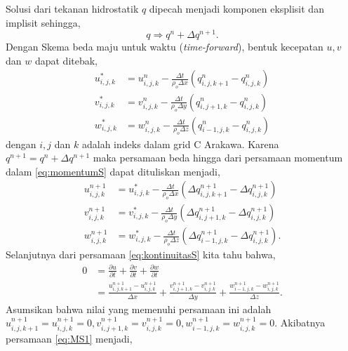 \begin{spacing}{1.5}
	Solusi dari tekanan hidrostatik $q$ dipecah menjadi komponen eksplisit dan implisit sehingga,
	\begin{equation*}
		q \Rightarrow q^n + \Delta q^{n+1}.
	\end{equation*}
	Dengan Skema beda maju untuk waktu (\textit{time-forward}), bentuk kecepatan $u, v$ dan $w$ dapat ditebak,
	\begin{equation}
		\begin{aligned}
			u_{i,j,k}^{*} &= u_{i,j,k}^{n}-\frac{\Delta t}{\rho_o \Delta x}(q_{i,j,k+1}^{n}-q_{i,j,k}^{n}) \\
			v_{i,j,k}^{*} &= v_{i,j,k}^{n}-\frac{\Delta t}{\rho_o \Delta y}(q_{i,j+1,k}^{n}-q_{i,j,k}^{n})
			\\
			w_{i,j,k}^{*} &= w_{i,j,k}^{n}-\frac{\Delta t}{\rho_o \Delta z}(q_{i-1,j,k}^{n}-q_{i,j,k}^{n})
		\end{aligned}
	\end{equation}
	dengan $i,j$ dan $k$ adalah indeks dalam grid C Arakawa. Karena $q^{n+1} = q^{n} + \Delta q^{n+1} $ maka persamaan beda hingga dari persamaan momentum dalam \ref{eq:momentumS} dapat dituliskan menjadi,
	\begin{equation}\label{eq:MS1}
		\begin{aligned}
			u_{i,j,k}^{n+1} &= u_{i,j,k}^{*}-\frac{\Delta t}{\rho_o \Delta x}(\Delta q_{i,j,k+1}^{n+1}-\Delta q_{i,j,k}^{n+1}) \\
			v_{i,j,k}^{n+1} &= v_{i,j,k}^{*}-\frac{\Delta t}{\rho_o \Delta y}(\Delta q_{i,j+1,k}^{n+1}-\Delta q_{i,j,k}^{n+1})
			\\
			w_{i,j,k}^{n+1} &= w_{i,j,k}^{*}-\frac{\Delta t}{\rho_o \Delta z}(\Delta q_{i-1,j,k}^{n+1}-\Delta q_{i,j,k}^{n+1}).
		\end{aligned}
	\end{equation}
	Selanjutnya dari persamaan \ref{eq:kontinuitasS} kita tahu bahwa,
	\begin{equation}
		\begin{aligned}
			0 &= \frac{\partial u}{\partial t} + \frac{\partial v}{\partial t} + \frac{\partial w}{\partial t} \\
			&= \frac{u_{i,j,k+1}^{n+1}-u_{i,j,k}^{n+1}}{\Delta x} + \frac{v_{i,j+1,k}^{n+1}-v_{i,j,k}^{n+1}}{\Delta y} +
			\frac{w_{i-1,j,k}^{n+1}-w_{i,j,k}^{n+1}}{\Delta z}.
		\end{aligned}
	\end{equation}
	Asumsikan bahwa nilai yang memenuhi persamaan ini adalah $u_{i,j,k+1}^{n+1}=u_{i,j,k}^{n+1}=0, v_{i,j+1,k}^{n+1}=v_{i,j,k}^{n+1}=0, w_{i-1,j,k}^{n+1}=w_{i,j,k}^{n+1}=0$. Akibatnya persamaan \ref{eq:MS1} menjadi,

\end{spacing}
